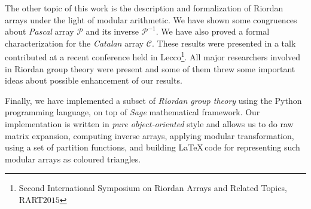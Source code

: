  The other topic of
this work is the description and formalization of Riordan arrays under the
light of modular arithmetic. We have shown some congruences about \emph{Pascal}
array $\mathcal{P}$ and its inverse $\mathcal{P}^{-1}$. We have also proved a
formal characterization for the \emph{Catalan} array $\mathcal{C}$. These
results were presented in a talk contributed at a recent conference held in
Lecco\footnote{Second International Symposium on Riordan Arrays and Related
Topics, RART$2015$}. All major researchers involved in Riordan group theory
were present and some of them threw some important ideas about possible
enhancement of our results.  

Finally, we have implemented a subset of \emph{Riordan group theory} using the
Python programming language, on top of \emph{Sage} mathematical framework.  Our
implementation is written in \emph{pure object-oriented} style and allows us to
do raw matrix expansion, computing inverse arrays, applying modular
    transformation, using a set of partition functions, and building \LaTeX\,code
    for representing such modular arrays as coloured triangles.

\iffalse
\vfill

\pdfbookmark[1]{Zusammenfassung}{Zusammenfassung}
\chapter*{Zusammenfassung}
Kurze Zusammenfassung des Inhaltes in deutscher Sprache\dots
\fi


\endgroup			

\vfill
